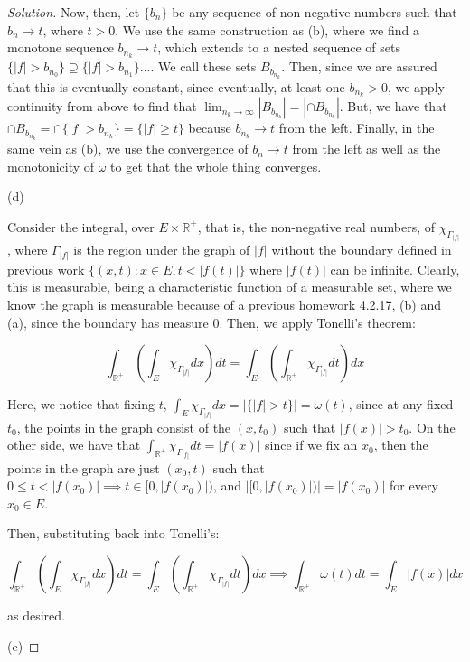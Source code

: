 \documentclass[10pt]{article}
\begin{document}
\begin{proof}[Solution]
Now, then, let $\{ b_n \}$ be any sequence of non-negative numbers such that $b_n \to t$, where $t > 0$. We use the same construction as (b), where we find a monotone sequence $ b_{n_k} \to t$, which extends to a nested sequence of sets $\{ |f| > b_{n_0} \} \supseteq \{ |f| > b_{n_1} \} ...$. We call these sets $B_{b_{n_k}}$. Then, since we are assured that this is eventually constant, since eventually, at least one $b_{n_k} > 0$, we apply continuity from above to find that $\lim_{n_k \to \infty} |B_{b_{n_k}}| = |\cap B_{b_{n_k}}|$. But, we have that $\cap B_{b_{n_k}} = \cap \{ |f| > b_{n_k} \} = \{ |f| \geq t \}$ because $b_{n_k} \to t$ from the left. Finally, in the same vein as (b), we use the convergence of $b_n \to t$ from the left as well as the monotonicity of $\omega$ to get that the whole thing converges.

(d)

Consider the integral, over $E \times \mathbb{R}^+$, that is, the non-negative real numbers, of $\chi_{\Gamma_{|f|}}$, where $\Gamma_{|f|}$ is the region under the graph of $|f|$ without the boundary defined in previous work $\{ (x,t) : x \in E, t < |f(t)| \}$ where $|f(t)|$ can be infinite. Clearly, this is measurable, being a characteristic function of a measurable set, where we know the graph is measurable because of a previous homework 4.2.17, (b) and (a), since the boundary has measure 0. Then, we apply Tonelli's theorem:

$$ \int_{\mathbb{R}^+} \left( \int_E \chi_{\Gamma_{|f|}} dx \right) dt =  \int_E \left( \int_{\mathbb{R}^+} \chi_{\Gamma_{|f|}} dt \right) dx$$ 

Here, we notice that fixing $t$, $\int_E \chi_{\Gamma_{|f|}} dx  = | \{ |f| > t \}|  = \omega(t)$, since at any fixed $t_0$, the points in the graph consist of the $(x,t_0)$ such that $|f(x)| > t_0$. On the other side, we have that $ \int_{\mathbb{R}^+} \chi_{\Gamma_{|f|}} dt = |f(x)|$ since if we fix an $x_0$, then the points in the graph are just $(x_0,t)$ such that $0 \leq t < |f(x_0)| \implies t \in [0 ,|f(x_0)|)$, and $| [0 ,|f(x_0)|)| = |f(x_0)|$ for every $x_0 \in E$.

Then, substituting back into Tonelli's:

$$ \int_{\mathbb{R}^+} \left( \int_E \chi_{\Gamma_{|f|}} dx \right) dt =  \int_E \left( \int_{\mathbb{R}^+} \chi_{\Gamma_{|f|}} dt \right) dx \implies  \int_{\mathbb{R}^+} \omega(t) dt = \int_E |f(x)| dx $$

as desired.

(e)


\end{proof}
\end{document}

